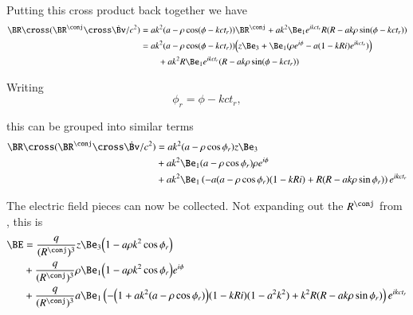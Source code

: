 {Putting this cross product back together we have
%
\begin{equation}\label{eqn:relativisticElectrodynamicsExamReflection:1150}
\begin{aligned}
\BR \cross (\BR^\conj \cross \dot{\Bv}/c^2)
&=
a k^2 ( a -\rho \cos(\phi - k c t_r) ) \BR^\conj
+a k^2 \Be_1 e^{i k c  t_r} R(R - a k \rho \sin(\phi - k c t_r)) \\
&=
a k^2 ( a -\rho \cos(\phi - k c t_r) ) \Bigl(
z \Be_3 + \Be_1 (\rho e^{i \phi} - a (1 - k R i) e^{i k c t_r} )
\Bigr) \\
&\qquad +a k^2 R \Be_1 e^{i k c  t_r} (R - a k \rho \sin(\phi - k c t_r))
\end{aligned}
\end{equation}

Writing
%
\begin{equation}\label{eqn:relativisticElectrodynamicsExamReflection:640}
\phi_r = \phi - k c t_r,
\end{equation}

this can be grouped into similar terms
%
\begin{equation}\label{eqn:relativisticElectrodynamicsExamReflection:660}
\begin{aligned}
\BR \cross (\BR^\conj \cross \dot{\Bv}/c^2)
&=
a k^2
(a - \rho \cos\phi_r) z \Be_3 \\
&+
a k^2
\Be_1
(a - \rho \cos\phi_r) \rho e^{i\phi} \\
&+
a k^2
\Be_1
\left(
-a (a - \rho \cos\phi_r) (1 - k R i)
+ R(R - a k \rho \sin \phi_r)
\right) e^{i k c t_r}
\end{aligned}
\end{equation}

The electric field pieces can now be collected.  Not expanding out the \(R^\conj\) from , this is
%
\begin{equation}\label{eqn:relativisticElectrodynamicsExamReflection:700}
\begin{aligned}
\BE &=
\frac{q}{(R^\conj)^3} z \Be_3
\Bigl( 1 - a \rho k^2 \cos\phi_r \Bigr) \\
&+
\frac{q}{(R^\conj)^3} \rho
\Be_1 \Bigl(1 - a \rho k^2 \cos\phi_r \Bigr) e^{i\phi} \\
&+
\frac{q}{(R^\conj)^3} a \Be_1
\left(
-\Bigl( 1 + a k^2 (a - \rho \cos\phi_r) \Bigr) (1 - k R i)(1 - a^2 k^2)
+ k^2 R(R - a k \rho \sin \phi_r)
\right) e^{i k c t_r}
\end{aligned}
\end{equation}

}
